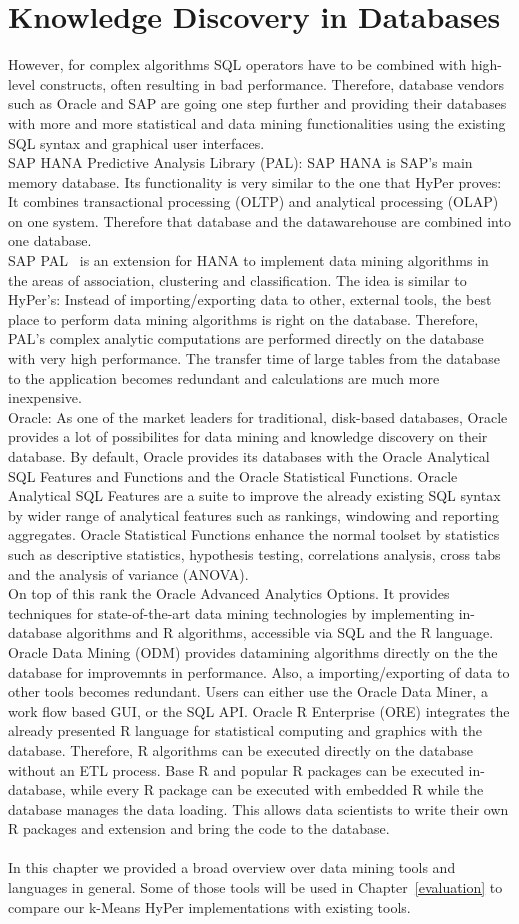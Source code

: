 \section{Knowledge Discovery in Databases}
However, for complex algorithms SQL operators have to be combined with high-level constructs, often resulting in bad performance. Therefore, database vendors such as Oracle and SAP are going one step further and providing their databases with more and more statistical and data mining functionalities using the existing SQL syntax and graphical user interfaces.
\\
SAP HANA Predictive Analysis Library (PAL): SAP HANA is SAP's main memory database. Its functionality is very similar to the one that HyPer proves: It combines transactional processing (OLTP) and analytical processing (OLAP) on one system. Therefore that database and the datawarehouse are combined into one database. 
\\
SAP PAL~\parencite{pal} is an extension for HANA to implement data mining algorithms in the areas of association, clustering and classification. The idea is similar to HyPer's: Instead of importing/exporting data to other, external tools, the best place to perform data mining algorithms is right on the database. Therefore, PAL's complex analytic computations are performed directly on the database with very high performance. The transfer time of large tables from the database to the application becomes redundant and calculations are much more inexpensive.
\\
Oracle: As one of the market leaders for traditional, disk-based databases, Oracle provides a lot of possibilites for data mining and knowledge discovery on their database. By default, Oracle provides its databases with the Oracle Analytical SQL Features and Functions and the Oracle Statistical Functions. Oracle Analytical SQL Features are a suite to improve the already existing SQL syntax by wider range of analytical features such as rankings, windowing and reporting aggregates. Oracle Statistical Functions enhance the normal toolset by statistics such as descriptive statistics, hypothesis testing, correlations analysis, cross tabs and the analysis of variance (ANOVA). 
\\
On top of this rank the Oracle Advanced Analytics Options. It provides techniques for state-of-the-art data mining technologies by implementing in-database algorithms and R algorithms, accessible via SQL and the R language. Oracle Data Mining (ODM) provides datamining algorithms directly on the the database for improvemnts in performance. Also, a importing/exporting of data to other tools becomes redundant. Users can either use the Oracle Data Miner, a work flow based GUI, or the SQL API. Oracle R Enterprise (ORE) integrates the already presented R language for statistical computing and graphics with the database. Therefore, R algorithms can be executed directly on the database without an ETL process. Base R and popular R packages can be executed in-database, while every R package can be executed with embedded R while the database manages the data loading. This allows data scientists to write their own R packages and extension and bring the code to the database.
\\
\\
In this chapter we provided a broad overview over data mining tools and languages in general. Some of those tools will be used in Chapter~\ref{evaluation} to compare our k-Means HyPer implementations with existing tools.

